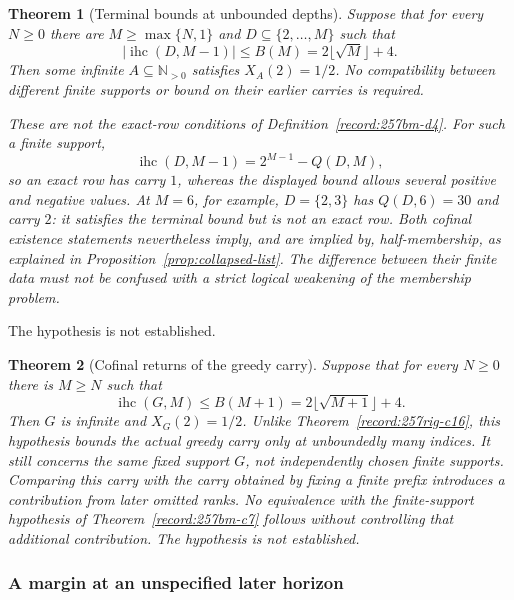 \documentclass[11pt]{article}
\theoremstyle{plain}
\newtheorem{thm}{Theorem}[section]
\theoremstyle{definition}
\theoremstyle{remark}
\newcommand{\Npos}{\mathbb{N}_{>0}}
\begin{document}
\begin{thm}[Terminal bounds at unbounded depths]\label{record:257rig-c17}
Suppose that for every $N\ge0$ there are $M\ge\max\{N,1\}$ and
$D\subseteq\{2,\ldots,M\}$ such that
\[
 |\operatorname{ihc}(D,M-1)|\le B(M)
       =2\lfloor\sqrt M\rfloor+4.
\]
Then some infinite $A\subseteq\Npos$ satisfies $X_A(2)=1/2$.
No compatibility between different finite supports or bound on their
earlier carries is required.

These are not the exact-row conditions of
Definition~\ref{record:257bm-d4}.  For such a finite support,
\[
 \operatorname{ihc}(D,M-1)=2^{M-1}-Q(D,M),
\]
so an exact row has carry $1$, whereas the displayed bound allows
several positive and negative values.  At $M=6$, for example,
$D=\{2,3\}$ has $Q(D,6)=30$ and carry $2$: it satisfies the
terminal bound but is not an exact row.
Both cofinal existence statements nevertheless imply, and are
implied by, half-membership, as explained in
Proposition~\ref{prop:collapsed-list}.  The difference between their
finite data must not be confused with a strict logical weakening
of the membership problem.
\end{thm}
The hypothesis is not established.

\begin{thm}[Cofinal returns of the greedy carry]\label{record:257rig-c18}
Suppose that for every $N\ge0$ there is $M\ge N$ such that
\[
 \operatorname{ihc}(G,M)\le B(M+1)
       =2\lfloor\sqrt{M+1}\rfloor+4.
\]
Then $G$ is infinite and $X_G(2)=1/2$.  Unlike
Theorem~\ref{record:257rig-c16}, this hypothesis bounds the actual greedy
carry only at unboundedly many indices.  It still concerns the same fixed
support $G$, not independently chosen finite supports.
Comparing this carry with the carry obtained by fixing a finite prefix introduces a contribution from later omitted ranks. No equivalence with the finite-support hypothesis
of Theorem~\ref{record:257bm-c7} follows without controlling that
additional contribution. The hypothesis is not established.
\end{thm}

\subsubsection*{A margin at an unspecified later horizon}
\end{document}

